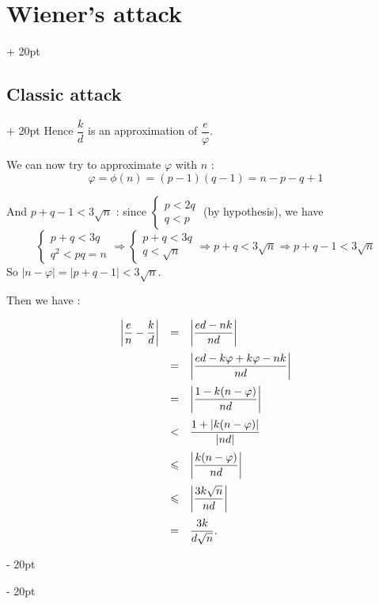 \documentclass[a4paper, 12pt, twoside]{article}
\newcommand{\abs}[1]{\left\lvert #1 \right\rvert}
\renewcommand{\le}{\leqslant}
\newcommand{\ind}[1][20pt]{\advance\leftskip + #1}
\newcommand{\deind}[1][20pt]{\advance\leftskip - #1}
\newenvironment{indt}[2][20pt]{#2 \par \ind[#1]}{\par \deind} %
\begin{document}
\begin{indt}{\section{Wiener's attack}}
\begin{indt}{\subsection{Classic attack}}
            Hence $\dfrac k d$ is an approximation of $\dfrac e \varphi$.
            
            We can now try to approximate $\varphi$ with $n$ :
            \[
                \varphi = \phi(n) = (p - 1)(q - 1) = n - p - q + 1
            \]
            
            And $p + q - 1 < 3\sqrt n$ : since
            $
                \begin{cases}
                    p < 2q
                    \\
                    q < p
                \end{cases}
            $
            (by hypothesis), we have
            \[
                \begin{cases}
                    p + q < 3q
                    \\
                    q^2 < pq = n
                \end{cases}
                \Rightarrow
                \begin{cases}
                    p + q < 3q
                    \\
                    q < \sqrt n
                \end{cases}
                \Rightarrow
                p + q < 3\sqrt n
                \Rightarrow p + q - 1 < 3\sqrt n
            \]
            So $\abs{n - \varphi} = \abs{p + q - 1} < 3\sqrt n$.
            
            \vspace{12pt}
            
            Then we have :
            
            \[
                \begin{array}{rcl}
                    \abs{\dfrac e n - \dfrac k d}
                    &=& \abs{\dfrac{ed - nk}{nd}}
                    \vspace{6pt}
                    \\
                    &=& \abs{\dfrac{ed - k\varphi + k\varphi - nk}{nd}}
                    \vspace{6pt}
                    \\
                    &=& \abs{\dfrac{1 - k(n - \varphi)}{nd}}
                    \vspace{6pt}
                    \\
                    &<& \dfrac{1 + \abs{k(n - \varphi)}}{\abs{nd}}
                    \vspace{6pt}
                    \\
                    &\le& \abs{\dfrac{k(n - \varphi)}{nd}}
                    \vspace{6pt}
                    \\
                    &\le& \abs{\dfrac{3k\sqrt{n}}{nd}}
                    \vspace{6pt}
                    \\
                    &=& \dfrac{3k}{d\sqrt n}.
                \end{array}
            \]
            

\end{indt}
\end{indt}
\end{document}
